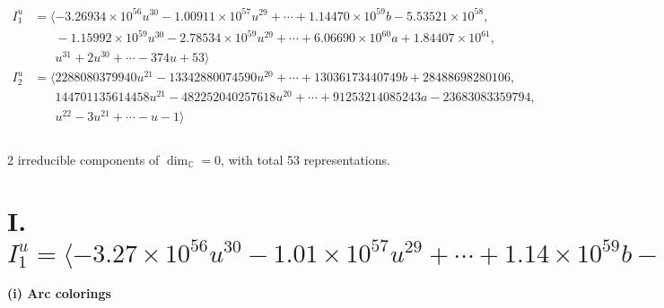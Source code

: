 \documentclass[1p]{elsarticle_modified}
\theoremstyle{definition}
\begin{document}
\begin{align*}
I^u_{1}&=\langle 
-3.26934\times10^{56} u^{30}-1.00911\times10^{57} u^{29}+\cdots+1.14470\times10^{59} b-5.53521\times10^{58},\\
\phantom{I^u_{1}}&\phantom{= \langle  }-1.15992\times10^{59} u^{30}-2.78534\times10^{59} u^{29}+\cdots+6.06690\times10^{60} a+1.84407\times10^{61},\\
\phantom{I^u_{1}}&\phantom{= \langle  }u^{31}+2 u^{30}+\cdots-374 u+53\rangle \\
I^u_{2}&=\langle 
2288080379940 u^{21}-13342880074590 u^{20}+\cdots+13036173440749 b+28488698280106,\\
\phantom{I^u_{2}}&\phantom{= \langle  }144701135614458 u^{21}-482252040257618 u^{20}+\cdots+91253214085243 a-23683083359794,\\
\phantom{I^u_{2}}&\phantom{= \langle  }u^{22}-3 u^{21}+\cdots- u-1\rangle \\
\\
\end{align*}
\raggedright * 2 irreducible components of $\dim_{\mathbb{C}}=0$, with total 53 representations.\\
\newpage
\renewcommand{\arraystretch}{1}
\centering \section*{I. $I^u_{1}= \langle -3.27\times10^{56} u^{30}-1.01\times10^{57} u^{29}+\cdots+1.14\times10^{59} b-5.54\times10^{58},\;-1.16\times10^{59} u^{30}-2.79\times10^{59} u^{29}+\cdots+6.07\times10^{60} a+1.84\times10^{61},\;u^{31}+2 u^{30}+\cdots-374 u+53 \rangle$}
\flushleft \textbf{(i) Arc colorings}\\
\end{document}
